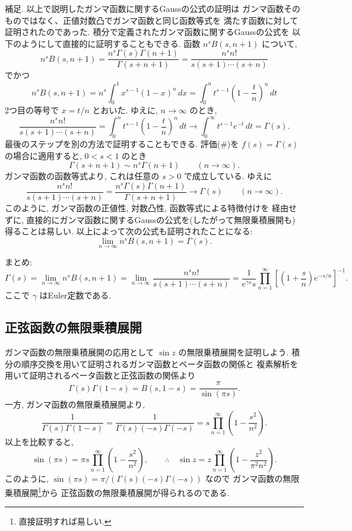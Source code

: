 \documentclass[12pt,twoside]{jarticle}
\theoremstyle{jplain}
\theoremstyle{jplain}
\theoremstyle{jplain}
\numberwithin{theorem}{section}
\numberwithin{equation}{section}
\numberwithin{figure}{section}
\numberwithin{table}{section}
\begin{document}
補足. 以上で説明したガンマ函数に関するGaussの公式の証明は
ガンマ函数そのものではなく、正値対数凸でガンマ函数と同じ函数等式を
満たす函数に対して証明されたのであった. 
積分で定義されたガンマ函数に関するGaussの公式を
以下のようにして直接的に証明することもできる.
函数 $n^s B(s,n+1)$ について,
\[
n^sB(s,n+1)
=\frac{n^s\Gamma(s)\Gamma(n+1)}{\Gamma(s+n+1)}
=\frac{n^s n!}{s(s+1)\cdots(s+n)}
\]
でかつ
\[
n^sB(s,n+1)
=n^s\int_0^1 x^{s-1}(1-x)^n\,dx
=\int_0^n t^{s-1}\left(1-\frac{t}{n}\right)^n\,dt
\]
2つ目の等号で $x=t/n$ とおいた. ゆえに, $n\to\infty$ のとき, 
\[
\frac{n^s n!}{s(s+1)\cdots(s+n)}
=\int_0^n t^{s-1}\left(1-\frac{t}{n}\right)^n\,dt
\longrightarrow
\int_0^\infty t^{s-1}e^{-t}\,dt
=\Gamma(s).
\]
最後のステップを別の方法で証明することもできる.
評価($\#$)を $f(s)=\Gamma(s)$ の場合に適用すると,
$0<s<1$ のとき
\[
\Gamma(s+n+1)\sim n^s\Gamma(n+1)
\qquad(n\to\infty).
\]
ガンマ函数の函数等式より, これは任意の $s>0$ で成立している. ゆえに
\[
\frac{n^s n!}{s(s+1)\cdots(s+n)}
=\frac{n^s\Gamma(s)\Gamma(n+1)}{\Gamma(s+n+1)}
\longrightarrow
\Gamma(s)
\qquad(n\to\infty).
\]
このように, ガンマ函数の正値性, 対数凸性, 函数等式による特徴付けを
経由せずに, 直接的にガンマ函数に関するGaussの公式を(したがって無限乗積展開も)
得ることは易しい.  以上によって次の公式も証明されたことになる:
\[
\lim_{n\to\infty}n^s B(s,n+1)=\Gamma(s).
\]

まとめ:
\[
\Gamma(s)
=\lim_{n\to\infty}n^sB(s,n+1)
=\lim_{n\to\infty}\frac{n^s n!}{s(s+1)\cdots(s+n)}
=\frac{1}{e^{\gamma s}s}\prod_{n=1}^\infty\left[\left(1+\frac{s}{n}\right)e^{-s/n}\right]^{-1}.
\]
ここで $\gamma$ はEuler定数である.



\subsection{正弦函数の無限乗積展開}

ガンマ函数の無限乗積展開の応用として $\sin z$ の無限乗積展開を証明しよう.
積分の順序交換を用いて証明されるガンマ函数とベータ函数の関係と
複素解析を用いて証明されるベータ函数と正弦函数の関係より
\[
\Gamma(s)\Gamma(1-s)=B(s,1-s)=\frac{\pi}{\sin(\pi s)}.
\]
一方, ガンマ函数の無限乗積展開より,
\[
\frac{1}{\Gamma(s)\Gamma(1-s)}
=\frac{1}{\Gamma(s)(-s)\Gamma(-s)}
=s\prod_{n=1}^\infty\left(1-\frac{s^2}{n^2}\right).
\]
以上を比較すると,
\[
\sin(\pi s)=\pi s\prod_{n=1}^\infty\left(1-\frac{s^2}{n^2}\right),
\qquad\therefore\quad
\sin z=z\prod_{n=1}^\infty\left(1-\frac{z^2}{\pi^2n^2}\right).
\]
このように, $\sin(\pi s)=\pi/(\Gamma(s)(-s)\Gamma(-s))$ なので
ガンマ函数の無限乗積展開\footnote{直接証明すれば易しい.}から
正弦函数の無限乗積展開が得られるのである.
\end{document}
